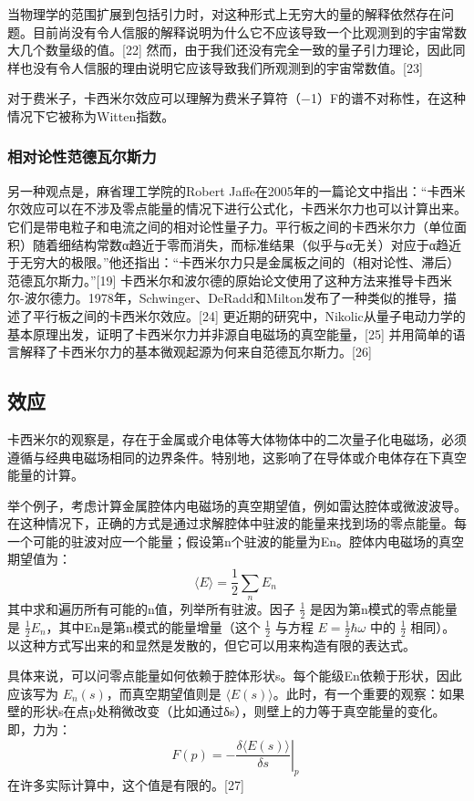 当物理学的范围扩展到包括引力时，对这种形式上无穷大的量的解释依然存在问题。目前尚没有令人信服的解释说明为什么它不应该导致一个比观测到的宇宙常数大几个数量级的值。[22] 然而，由于我们还没有完全一致的量子引力理论，因此同样也没有令人信服的理由说明它应该导致我们所观测到的宇宙常数值。[23]

对于费米子，卡西米尔效应可以理解为费米子算符（−1）F的谱不对称性，在这种情况下它被称为Witten指数。
\subsubsection{相对论性范德瓦尔斯力}
另一种观点是，麻省理工学院的Robert Jaffe在2005年的一篇论文中指出：“卡西米尔效应可以在不涉及零点能量的情况下进行公式化，卡西米尔力也可以计算出来。它们是带电粒子和电流之间的相对论性量子力。平行板之间的卡西米尔力（单位面积）随着细结构常数α趋近于零而消失，而标准结果（似乎与α无关）对应于α趋近于无穷大的极限。”他还指出：“卡西米尔力只是金属板之间的（相对论性、滞后）范德瓦尔斯力。”[19] 卡西米尔和波尔德的原始论文使用了这种方法来推导卡西米尔-波尔德力。1978年，Schwinger、DeRadd和Milton发布了一种类似的推导，描述了平行板之间的卡西米尔效应。[24] 更近期的研究中，Nikolic从量子电动力学的基本原理出发，证明了卡西米尔力并非源自电磁场的真空能量，[25] 并用简单的语言解释了卡西米尔力的基本微观起源为何来自范德瓦尔斯力。[26]
\subsection{效应}
卡西米尔的观察是，存在于金属或介电体等大体物体中的二次量子化电磁场，必须遵循与经典电磁场相同的边界条件。特别地，这影响了在导体或介电体存在下真空能量的计算。

举个例子，考虑计算金属腔体内电磁场的真空期望值，例如雷达腔体或微波波导。在这种情况下，正确的方式是通过求解腔体中驻波的能量来找到场的零点能量。每一个可能的驻波对应一个能量；假设第n个驻波的能量为En。腔体内电磁场的真空期望值为：
\[
\langle E \rangle = \frac{1}{2} \sum_{n} E_n~
\]
其中求和遍历所有可能的n值，列举所有驻波。因子 \( \frac{1}{2} \) 是因为第n模式的零点能量是 \( \frac{1}{2} E_n \)，其中En是第n模式的能量增量（这个 \( \frac{1}{2} \) 与方程 \( E = \frac{1}{2} \hbar \omega \) 中的 \( \frac{1}{2} \) 相同）。以这种方式写出来的和显然是发散的，但它可以用来构造有限的表达式。

具体来说，可以问零点能量如何依赖于腔体形状s。每个能级En依赖于形状，因此应该写为 \( E_n(s) \)，而真空期望值则是 \( \langle E(s) \rangle \)。此时，有一个重要的观察：如果壁的形状s在点p处稍微改变（比如通过δs），则壁上的力等于真空能量的变化。即，力为：
\[
F(p) = - \left. \frac{\delta \langle E(s) \rangle}{\delta s} \right|_p~
\]
在许多实际计算中，这个值是有限的。[27]

